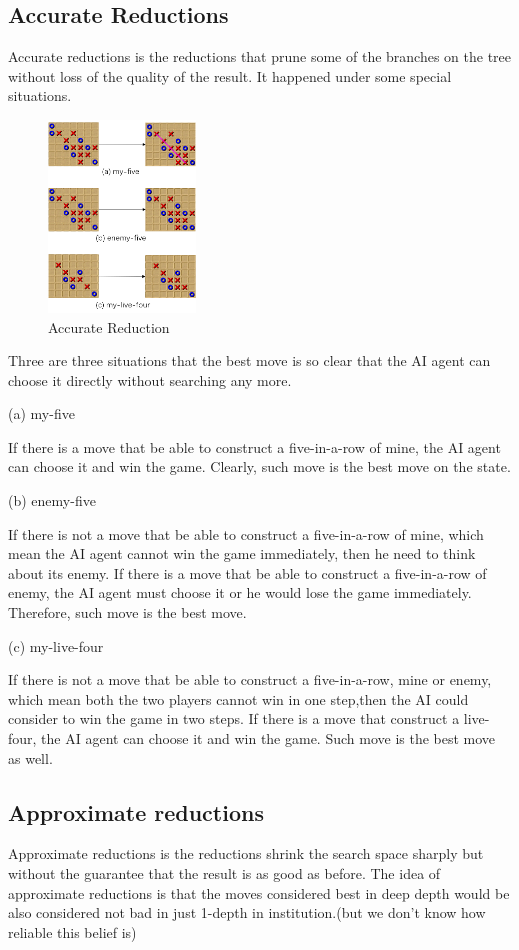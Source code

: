 \documentclass[final]{cvpr}
\begin{document}
\subsection{Accurate Reductions} 
Accurate reductions is the reductions that prune some of the branches on the tree without loss of the quality of the result. 
%
It happened under some special situations.
%

\begin{figure}[htbp]
\centering 
\includegraphics[width=0.35\textwidth]{figures/pic5.png} 
\caption{Accurate Reduction} 
\label{Fig.main2} %
\end{figure}

Three are three situations that the best move is so clear that the AI agent can choose it directly without searching any more.
%

(a) my-five

If there is a move that be able to construct a five-in-a-row of mine, the AI agent can choose it and win the game. Clearly, such move is the best move on the state.

(b) enemy-five

If there is not a move that be able to construct a five-in-a-row of mine,
which mean the AI agent cannot win the game immediately, then he need to think about its enemy. If there is a move that be able to construct a five-in-a-row of enemy, the AI agent must choose it or he would lose the game immediately. Therefore, such move is the best move.

(c) my-live-four

If there is not a move that be able to construct a five-in-a-row, mine or enemy, which mean both the two players cannot win in one step,then the AI could consider to win the game in two steps. If there is a move that construct a live-four, the AI agent can choose it and win the game. Such move is the best move as well.

\subsection{Approximate reductions}
%
Approximate reductions is the reductions shrink the search space sharply but without the guarantee that the result is as good as before.
%
The idea of approximate reductions is that the moves considered best in deep depth would be also considered not bad in just 1-depth in institution.(but we don't know how reliable this belief is)
%
\end{document}
